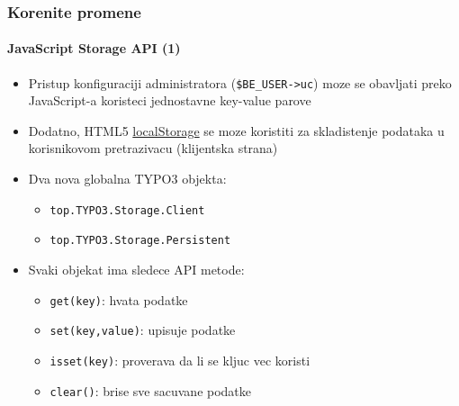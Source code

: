 
\begin{frame}[fragile]
	\frametitle{Korenite promene}
	\framesubtitle{JavaScript Storage API (1)}

	\begin{itemize}
		\item Pristup konfiguraciji administratora (\texttt{\$BE\_USER->uc}) moze se obavljati preko JavaScript-a koristeci jednostavne key-value parove
		\item Dodatno, HTML5 \href{http://www.w3.org/TR/webstorage/}{localStorage}
			se moze koristiti za skladistenje podataka u korisnikovom pretrazivacu (klijentska strana)

		\item Dva nova globalna TYPO3 objekta:
			\begin{itemize}
				\item \texttt{top.TYPO3.Storage.Client}
				\item \texttt{top.TYPO3.Storage.Persistent}
			\end{itemize}

		\item Svaki objekat ima sledece API metode:
			\begin{itemize}
				\item \texttt{get(key)}: hvata podatke
				\item \texttt{set(key,value)}: upisuje podatke
				\item \texttt{isset(key)}: proverava da li se kljuc vec koristi
				\item \texttt{clear()}: brise sve sacuvane podatke
			\end{itemize}

	\end{itemize}

\end{frame}


